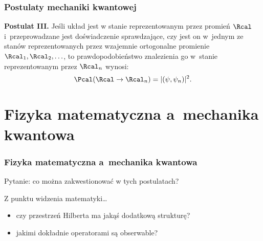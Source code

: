 \documentclass[10pt,t]{beamer}
\begin{document}
\begin{frame}
  \frametitle{Postulaty mechaniki kwantowej}


  \textbf{Postulat III.}
  Jeśli układ jest w stanie reprezentowanym przez promień $\Rcal$
  i~przeprowadzane jest doświadczenie sprawdzające, czy jest on w~jednym ze
  stanów reprezentowanych przez wzajemnie ortogonalne promienie
  $\Rcal_{ 1 }, \Rcal_{ 2 }, \ldots$, to prawdopodobieństwo znalezienia go w~stanie
  reprezentowanym przez $\Rcal_{ n }$ wynosi:
  \begin{equation}
    \label{eq:Matematyczna-strona-02}
    \Pcal( \Rcal \rightarrow \Rcal_{ n }) = | ( \psi, \psi_{ n } ) |^{ 2 }.
  \end{equation}

\end{frame}










\section{Fizyka matematyczna a~mechanika kwantowa}



\begin{frame}
  \frametitle{Fizyka matematyczna a~mechanika kwantowa}


  Pytanie: co można zakwestionować w tych postulatach?


  Z punktu widzenia matematyki\ldots
  \begin{itemize}
    \RaggedRight

  \item czy przestrzeń Hilberta ma jakąś dodatkową strukturę?

  \item jakimi dokładnie operatorami są obserwable?

  \end{itemize}

\end{frame}
\end{document}
